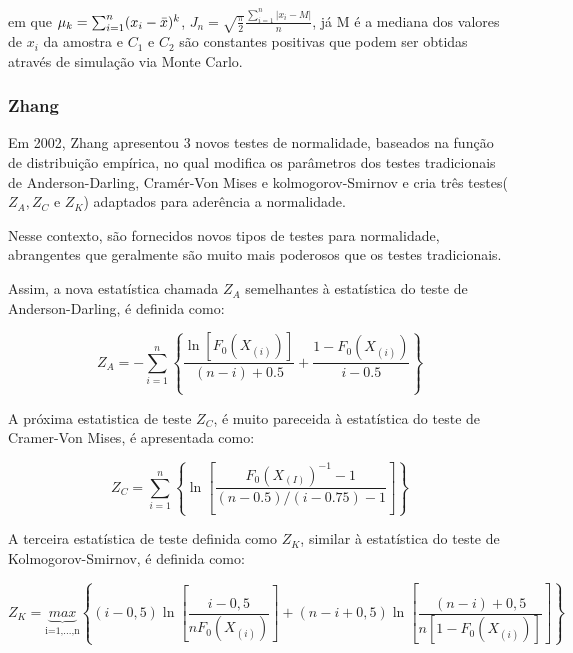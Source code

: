 \documentclass[a4paper,11pt]{article} %
\begin{document}
\noindent em que $\mu_{k} = \sum_{i=1}^{n} (x_{i}- \Bar{x})^{k}$, $J_{n} = \sqrt{\frac{\pi}{2}}\frac{\sum_{i=1}^{n}|x_{i}-M|}{n}$, já M é a mediana dos valores de $x_{i}$ da amostra e $C_{1}$ e $C_{2}$ são constantes positivas que podem ser obtidas através de simulação via Monte Carlo.

\subsubsection{Zhang}

Em 2002, Zhang apresentou 3 novos testes de normalidade, baseados na função de distribuição empírica, no qual modifica os parâmetros dos testes tradicionais de Anderson-Darling, Cramér-Von Mises e kolmogorov-Smirnov e cria três testes($Z_{A}, Z_{C}$ e $Z_{K}$) adaptados para aderência a normalidade.

\vspace{0.5cm}

Nesse contexto, são fornecidos novos tipos de testes para normalidade, abrangentes que geralmente são muito mais poderosos que os testes tradicionais.

\vspace{0.5cm}

Assim, a nova estatística chamada $Z_{A}$ semelhantes à estatística do teste de Anderson-Darling, é definida como:

\begin{equation}
    Z_{A} = - \sum_{i=1}^{n} \left\{  \frac{ \ln[F_{0}(X_{(i)})]}{(n-i)+0.5} + \frac{1-F_{0}(X_{(i)})}{i-0.5}  \right\}  
\end{equation}

A próxima estatistica de teste $Z_{C}$, é muito pareceida à estatística do teste de Cramer-Von Mises, é apresentada como:

\begin{equation}
    Z_{C} = \sum_{i=1}^{n}  \left\{ \ln\left[ \frac{F_{0}(X_{(I)})^{-1}-1}{(n-0.5)/(i-0.75)-1} \right] \right\}
\end{equation}

A terceira estatística de teste definida como $Z_{K}$, similar à estatística do teste de Kolmogorov-Smirnov, é definida como:

\begin{equation}
Z_{K} = \underbrace{max}_{\mbox{i=1,...,n}} \left\{(i - 0,5) \ln\left[ \frac{i - 0,5}{n F_{0}(X_{(i)})} \right] + (n - i + 0,5) \ln\left[ \dfrac{(n - i) + 0,5}{n[1 - F_{0}(X_{(i)})]} \right] \right\}
\end{equation}
\end{document}
